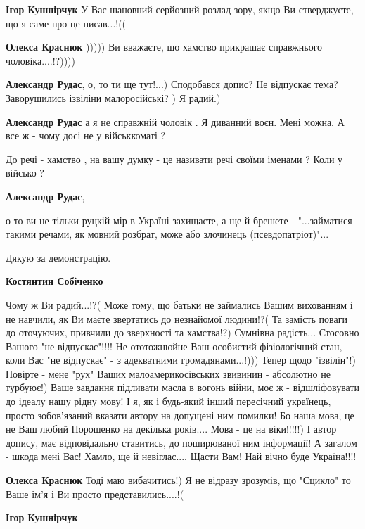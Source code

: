 \begin{itemize}
\begin{itemize}
\textbf{Ігор Кушнірчук}
У Вас шановний серйозний розлад зору, якщо Ви стверджуєте, що я саме про це писав...!((

\textbf{Олекса Краснюк}
)))))
Ви вважаєте, що хамство прикрашає справжнього чоловіка....!?))))

\textbf{Александр Рудас}, о, то ти ще тут!...) Сподобався допис? Не відпускає тема? Заворушились ізвіліни малоросійські? ) Я радий.)

\textbf{Александр Рудас} а я не справжній чоловік . Я диванний воєн. Мені можна. А все ж - чому досі не у військкоматі ?


До речі - хамство , на вашу думку - це називати речі своїми іменами ? Коли у військо ?

\textbf{Александр Рудас}, 

о то ви не тільки руцкій мір в Україні захищаєте, а ще й брешете -
"...займатися такими речами, як мовний розбрат, може або злочинець
(псевдопатріот)"...

Дякую за демонстрацію.

\textbf{Костянтин Собіченко}

\obeycr
Чому ж Ви радий...!?(
Може тому, що батьки не займались Вашим вихованням і не навчили, як Ви маєте звертатись до незнайомої людини!?(
Та замість поваги до оточуючих, привчили до зверхності та хамства!?)
Сумнівна радість...
Стосовно Вашого "не відпускає"!!!! Не ототожнюйне Ваш особистий фізіологічний стан, коли Вас "не відпускає" - з адекватними громадянами...!)))
Тепер щодо "ізвілін"!)
Повірте - мене "рух" Ваших малоамерикосівських звивинин - абсолютно не турбуює!)
Ваше завдання підливати масла в вогонь війни, моє ж - відшліфовувати до ідеалу нашу рідну мову!
І я, як і будь-який інший пересічний українець, просто зобов'язаний вказати автору на допущені ним помилки!
Бо наша мова, це не Ваш любий Порошенко на декілька років.... Мова - це на віки!!!!!)
І автор допису, має відповідально ставитись, до поширюваної ним інформації!
А загалом - шкода мені Вас!
Хамло, ще й невіглас....
Щасти Вам!
Най вічно буде Україна!!!!
\restorecr

\textbf{Олекса Краснюк}
Тоді маю вибачитись!)
Я не відразу зрозумів, що "Сцикло" то Ваше ім'я і Ви просто представились....!(

\textbf{Ігор Кушнірчук}


\end{itemize}
\end{itemize}
